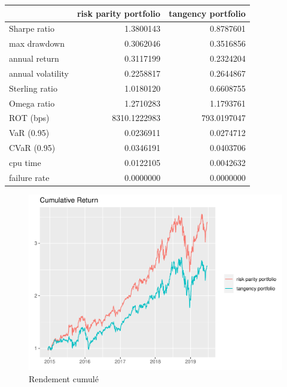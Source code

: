 \documentclass[
]{article}
\begin{document}
\begin{tabular}{lrr}
\toprule
  & risk parity portfolio & tangency portfolio\\
\midrule
Sharpe ratio & 1.3800143 & 0.8787601\\
max drawdown & 0.3062046 & 0.3516856\\
annual return & 0.3117199 & 0.2324204\\
annual volatility & 0.2258817 & 0.2644867\\
Sterling ratio & 1.0180120 & 0.6608755\\
\addlinespace
Omega ratio & 1.2710283 & 1.1793761\\
ROT (bps) & 8310.1222983 & 793.0197047\\
VaR (0.95) & 0.0236911 & 0.0274712\\
CVaR (0.95) & 0.0346191 & 0.0403706\\
cpu time & 0.0122105 & 0.0042632\\
\addlinespace
failure rate & 0.0000000 & 0.0000000\\
\bottomrule
\end{tabular}

\begin{figure}
\centering
\includegraphics{TP-4_files/figure-latex/unnamed-chunk-7-1.pdf}
\caption{Rendement cumulé}
\end{figure}
\end{document}
